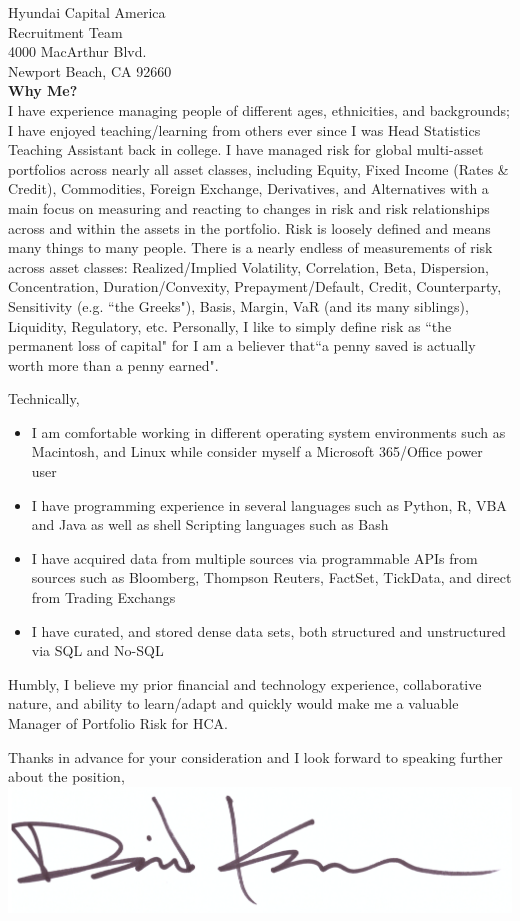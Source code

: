 \documentclass{letter}
\begin{document}
\begin{letter}{
  Hyundai Capital America \\
  Recruitment Team \\
  4000 MacArthur Blvd. \\
  Newport Beach, CA 92660 \\
}
\textbf{Why Me?} \\
I have experience managing people of different ages, ethnicities, and backgrounds; I
have enjoyed teaching/learning from others ever since I was Head Statistics Teaching
Assistant back in college. I have managed risk for global multi-asset portfolios across
nearly all asset classes, including Equity, Fixed Income (Rates \& Credit),
Commodities, Foreign Exchange, Derivatives, and Alternatives with a main focus
on measuring and reacting to changes in risk and risk relationships across and
within the assets in the portfolio. Risk is loosely defined and means many things
to many people. There is a nearly endless of measurements of risk across asset classes:
Realized/Implied Volatility, Correlation, Beta, Dispersion, Concentration,
Duration/Convexity, Prepayment/Default, Credit, Counterparty, Sensitivity (e.g.
``the Greeks"), Basis, Margin, VaR (and its many siblings), Liquidity, Regulatory,
etc. Personally, I like to simply define risk as ``the permanent loss of capital" for
I am a believer that``a penny saved is actually worth more than a penny earned".

\newpage

Technically,
\begin{itemize}
  \item I am comfortable working in different operating system environments such
  as Macintosh, and Linux while consider myself a Microsoft 365/Office power user
  \item I have programming experience in several languages such as Python, R, VBA
  and Java as well as shell Scripting languages such as Bash
  \item I have acquired data from multiple sources via programmable APIs from sources
  such as Bloomberg, Thompson Reuters, FactSet, TickData, and direct from Trading Exchangs
  \item I have curated, and stored dense data sets, both structured and unstructured
  via SQL and No-SQL 
\end{itemize}
Humbly, I believe my prior financial and technology experience, collaborative nature,
and ability to learn/adapt and quickly would make me a valuable Manager of Portfolio
Risk for HCA.
 
\closing{
  Thanks in advance for your consideration and I look forward to speaking further
  about the position, \\
  \vspace{.33in}
  \includegraphics[scale=0.33]{signature.png}
}

\end{letter}
\end{document}
